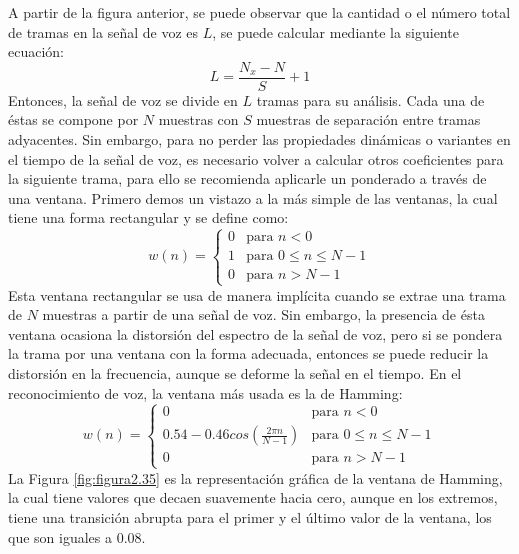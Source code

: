\begin{enumerate}
A partir de la figura anterior, se puede observar que la cantidad o el número total de tramas en la señal de voz es $L$, se puede calcular mediante la siguiente ecuación:
\begin{equation}
\label{eq:ecuacion34}
L = \frac{N_{x} - N}{S} + 1
\end{equation}
Entonces, la señal de voz se divide en $L$ tramas para su análisis. Cada una de éstas se compone por $N$ muestras con $S$ muestras de separación entre tramas adyacentes. Sin embargo, para no perder las propiedades dinámicas o variantes en el tiempo de la señal de voz, es necesario volver a calcular otros coeficientes para la siguiente trama, para ello se recomienda aplicarle un ponderado a través de una ventana. Primero demos un vistazo a la más simple de las ventanas, la cual tiene una forma rectangular y se define como:
\begin{equation}
\label{eq:ecuacion35}
%
w(n) = 
\begin{cases}
0 & \text{para $n < 0$} \\ 
1 & \text{para $0 \leq  n \leq  N-1$} \\ 
0 & \text{para $n > N-1$} 
\end{cases}
%
\end{equation}
Esta ventana rectangular se usa de manera implícita cuando se extrae una trama de $N$ muestras a partir de una señal de voz. Sin embargo, la presencia de ésta ventana ocasiona la distorsión del espectro de la señal de voz, pero si se pondera la trama por una ventana con la forma adecuada, entonces se puede reducir la distorsión en la frecuencia, aunque se deforme la señal en el tiempo. En el reconocimiento de voz, la ventana más usada es la de Hamming:
\begin{equation}
\label{eq:ecuacion36}
%
w(n) = 
\begin{cases}
0 & \text{para $n < 0$} \\ 
0.54 - 0.46cos(\frac{2\pi n}{N-1}) & \text{para $0 \leq  n \leq  N-1$} \\ 
0 & \text{para $n > N-1$} 
\end{cases}
%
\end{equation}
La Figura \ref{fig:figura2.35} es la representación gráfica de la ventana de Hamming, la cual tiene valores que decaen suavemente hacia cero, aunque en los extremos, tiene una transición abrupta para el primer y el último valor de la ventana, los que son iguales a 0.08.


\end{enumerate}
